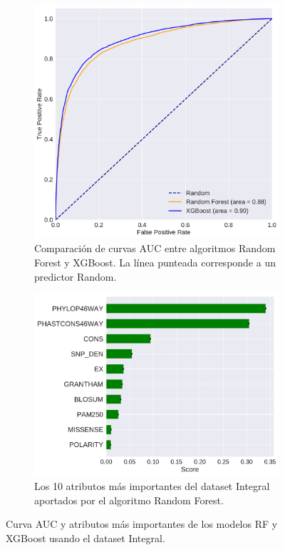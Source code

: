 \begin{figure}[H]
\centering
\begin{subfigure}[t]{0.7\textwidth}
    \centering
    \includegraphics[width=\textwidth]{documents/latex/figures/3/integral/auc_integral.pdf}
    \caption{Comparación de curvas AUC entre algoritmos Random Forest y XGBoost. La línea punteada corresponde a un predictor Random.}
    \label{fig:auc_integral}
\end{subfigure}
\hfill
\hfill
\begin{subfigure}[b]{0.7\textwidth}
    \centering
    \includegraphics[width=\textwidth]{documents/latex/figures/3/integral/importances_integral.pdf}
    \caption{Los 10 atributos más importantes del dataset Integral aportados por el algoritmo Random Forest.}
    \label{fig:importances_integral_rf}
\end{subfigure}

\caption{Curva AUC y atributos más importantes de los modelos RF y XGBoost usando el dataset Integral.}

\end{figure}
